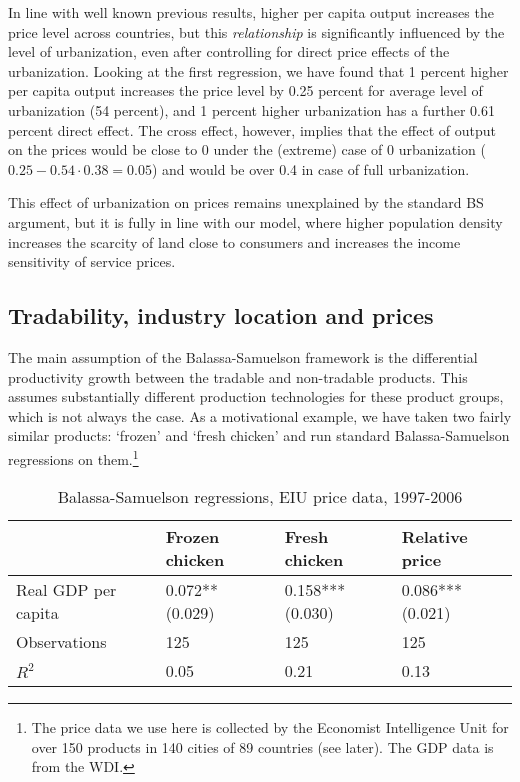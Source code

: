 \documentclass[12pt]{article}
\begin{document}
In line with well known previous results, higher per capita output
increases the price level across countries, but this \emph{relationship} is significantly influenced by the level of urbanization, even after controlling for direct price effects of the urbanization. Looking at the first regression, we have found that 1 percent higher per capita output increases the price level by 0.25 percent for average level of urbanization (54 percent), and 1 percent higher urbanization has a further 0.61 percent direct effect. The cross effect, however, implies that the effect of output on the prices would be close to 0 under the (extreme) case of 0 urbanization ($0.25-0.54\cdot0.38=0.05$) and would be over 0.4 in case of full urbanization.

This effect of urbanization on prices remains unexplained by the standard BS argument, but it is fully in line with our model, where higher population density increases the scarcity of land close to consumers and increases the income sensitivity of service prices.

\subsection{Tradability, industry location and prices}

The main assumption of the Balassa-Samuelson framework is the differential productivity growth between the tradable and non-tradable products. This assumes substantially different production technologies for these product groups, which is not always the case. As a motivational example, we have taken two fairly similar products: `frozen' and `fresh chicken' and run standard Balassa-Samuelson regressions on them.\footnote{The price data we use here is collected by the Economist Intelligence Unit for over 150 products in 140 cities of 89 countries (see later). The GDP data is from the WDI.}

\begin{table}[h!]
\center
\caption{Balassa-Samuelson regressions, EIU price data, 1997-2006}
\begin{tabular}{lm{5em}m{5em}m{5em}}
  \hline\hline
   & Frozen chicken & Fresh chicken & Relative price\\
   \hline
  Real GDP per capita & 0.072**   (0.029) & 0.158***   (0.030) & 0.086***   (0.021)\\
\hline
  Observations &  125 & 125 & 125
\\
  $R^2$ &  0.05& 0.21 & 0.13
\\
  \hline\hline
\end{tabular}
\end{table}
\end{document}
